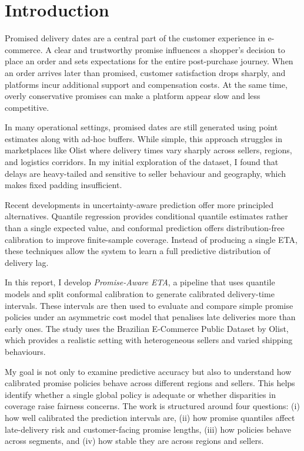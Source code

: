 \documentclass[12pt]{article}
\begin{document}
\section{Introduction}

Promised delivery dates are a central part of the customer experience in e-commerce. A clear and trustworthy promise influences a shopper’s decision to place an order and sets expectations for the entire post-purchase journey. When an order arrives later than promised, customer satisfaction drops sharply, and platforms incur additional support and compensation costs. At the same time, overly conservative promises can make a platform appear slow and less competitive.

In many operational settings, promised dates are still generated using point estimates along with ad-hoc buffers. While simple, this approach struggles in marketplaces like Olist where delivery times vary sharply across sellers, regions, and logistics corridors. In my initial exploration of the dataset, I found that delays are heavy-tailed and sensitive to seller behaviour and geography, which makes fixed padding insufficient.

Recent developments in uncertainty-aware prediction offer more principled alternatives. Quantile regression provides conditional quantile estimates rather than a single expected value, and conformal prediction offers distribution-free calibration to improve finite-sample coverage. Instead of producing a single ETA, these techniques allow the system to learn a full predictive distribution of delivery lag.

In this report, I develop \emph{Promise-Aware ETA}, a pipeline that uses quantile models and split conformal calibration to generate calibrated delivery-time intervals. These intervals are then used to evaluate and compare simple promise policies under an asymmetric cost model that penalises late deliveries more than early ones. The study uses the Brazilian E-Commerce Public Dataset by Olist, which provides a realistic setting with heterogeneous sellers and varied shipping behaviours.

My goal is not only to examine predictive accuracy but also to understand how calibrated promise policies behave across different regions and sellers. This helps identify whether a single global policy is adequate or whether disparities in coverage raise fairness concerns. The work is structured around four questions: (i) how well calibrated the prediction intervals are, (ii) how promise quantiles affect late-delivery risk and customer-facing promise lengths, (iii) how policies behave across segments, and (iv) how stable they are across regions and sellers.
\end{document}
